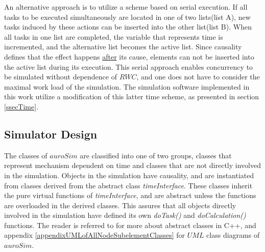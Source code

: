 		An alternative approach is to utilize a scheme based on serial execution.
		If all tasks to be executed simultaneously are located in one of two lists(list A), new tasks induced by these actions can be inserted into the other list(list B).
		When all tasks in one list are completed, the variable that represents time is incremented, and the alternative list becomes the active list.
		Since causality defines that the effect happens \underline{after} its cause, elements can not be inserted into the active list during its execution.
		This serial approach enables concurrency to be simulated without dependence of $RWC$, and one does not have to consider the maximal work load of the simulation. %
		The simulation software implemented in this work utilize a modification of this latter time scheme, as presented in section \ref{ssecTime}.



		\subsection{Simulator Design} 

			The classes of $auroSim$ are classified into one of two groups, classes that represent mechanism dependent on time and classes that are not directly involved in the simulation.
			Objects in the  simulation have causality, and are instantiated from classes derived from the abstract class \emph{timeInterface}.
			These classes inherit the pure virtual functions of \emph{timeInterface}, and are abstract unless the functions are overloaded in the derived classes.
			This assures that all objects directly involved in the simulation have defined its own \emph{doTask()} and \emph{doCalculation()} functions.
			The reader is referred to \cite[chap. 12]{Stroustrup2000} for more about abstract classes in C++, and appendix \ref{appendixUMLofAllNodeSubelementClasses} for $UML$ class diagrams of $auroSim$.



